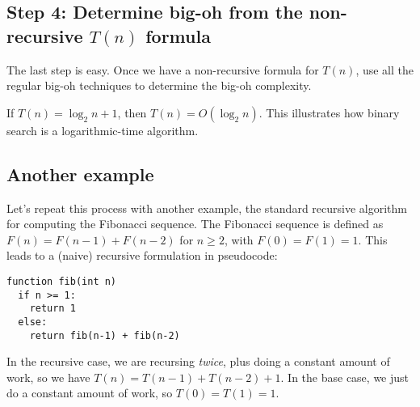 \documentclass [letterpaper,12pt]{article}
\begin{document}
\subsection*{Step 4: Determine big-oh from the non-recursive $T(n)$ formula}

The last step is easy.  Once we have a non-recursive formula for $T(n)$, use all the regular big-oh techniques
to determine the big-oh complexity.

If $T(n) = \log_2 n + 1$, then $T(n) = O(\log_2 n)$.  This illustrates how binary search is a logarithmic-time algorithm.

\subsection*{Another example}

Let's repeat this process with another example, the standard recursive algorithm for computing the Fibonacci sequence.
The Fibonacci sequence is defined as $F(n) = F(n-1) + F(n-2)$ for $n \geq 2$, with $F(0)=F(1)=1$.  This leads to a
(naive) recursive formulation in pseudocode:
\begin{verbatim}
function fib(int n)
  if n >= 1:
    return 1
  else:
    return fib(n-1) + fib(n-2)
\end{verbatim}
In the recursive case, we are recursing \emph{twice}, plus doing a constant amount of work, so we have
$T(n)=T(n-1)+T(n-2)+1$.  In the base case, we just do a constant amount of work, so $T(0)=T(1)=1$.
\end{document}
